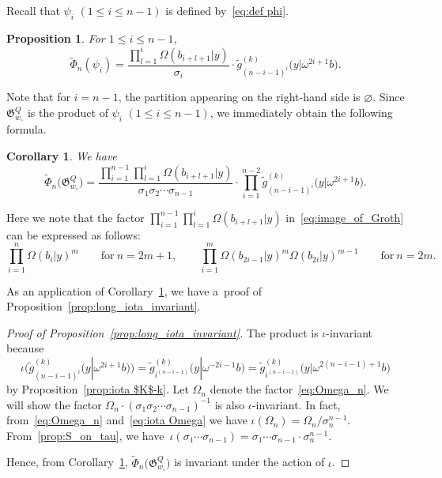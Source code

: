\documentclass[10pt,a4paper]{amsart}
\numberwithin{equation}{section}
\newcommand{\fac}{\psi}
\newtheorem{Corollary}[Theorem]{Corollary}
\newtheorem{Proposition}[Theorem]{Proposition}
\theoremstyle{definition}
\begin{document}
Recall that $\fac_i$ $(1\le i\le n-1)$ is defined by~\eqref{eq:def phi}.
\begin{Proposition}\label{prop:phi}
For $1\le i\le n-1$,
\[
\tilde{\Phi}_n(\fac_i)=
\frac{\prod_{l=1}^i\Omega(b_{i+l+1}|y)}{\sigma_i}\cdot\tilde{g}_{(n-i-1)^i}^{(k)}\bigl(y|\omega^{2i+1}b\bigr).
\]
\end{Proposition}
Note that for $i=n-1$,
the partition appearing on the right-hand side is $\varnothing$.
Since $\mathfrak{G}_{w_\circ}^Q$ is the product of $\fac_i$ $(1\le i\le n-1)$, we immediately obtain the following formula.
\begin{Corollary}\label{cor:image_of_Groth}
We have
\begin{equation}\label{eq:image_of_Groth}
\tilde{\Phi}_n\bigl(\mathfrak{G}_{w_\circ}^Q\bigr)
=
\frac{\prod_{i=1}^{n-1}\prod_{l=1}^i\Omega(b_{i+l+1}|y)}{{\sigma_1\sigma_2\cdots \sigma_{n-1}}}\cdot
{
\prod_{i=1}^{n-2}
\tilde{g}^{(k)}_{(n-i-1)^i}\bigl(y|\omega^{2i+1}b\bigr)
}.
\end{equation}
\end{Corollary}
Here we note
that the factor
$\prod_{i=1}^{n-1}\prod_{l=1}^i\Omega(b_{i+l+1}|y)$ in~\eqref{eq:image_of_Groth}
can be expressed as follows:
\begin{equation}
\label{eq:Omega_n}
\prod_{i=1}^n\Omega(b_i|y)^m\qquad \text{for} \ n=2m+1,\qquad
\prod_{i=1}^m\Omega(b_{2i-1}|y)^{m}\Omega(b_{2i}|y)^{m-1}\qquad \text{for} \  n=2m.
\end{equation}

As an application of Corollary~\ref{cor:image_of_Groth}, we have a~proof of Proposition~\ref{prop:long_iota_invariant}.
\begin{proof}[Proof of Proposition~\ref{prop:long_iota_invariant}]
The product  is $\iota$-invariant because
\[
\iota\bigl(\tilde{g}^{(k)}_{(n-i-1)^i}\bigl(y|\omega^{2i+1}b\bigr)\bigr)
=
\tilde{g}^{(k)}_{i^{(n-i-1)}}\bigl(y|\omega^{-2i-1}b\bigr)
=\tilde{g}^{(k)}_{i^{(n-i-1)}}\bigl(y|\omega^{2(n-i-1)+1}b\bigr)
\]
 by
Proposition~\ref{prop:iota $K$-k}.
Let $\Omega_n$ denote the factor~\eqref{eq:Omega_n}.
We will show the factor $\Omega_n\cdot (\sigma_1\sigma_2\cdots \sigma_{n-1})^{-1}$ is also $\iota$-invariant.
In fact, from~\eqref{eq:Omega_n} and~\eqref{eq:iota Omega} we have
$
\iota(\Omega_n)
=\Omega_n/ \sigma_n^{n-1}.
$
From~\eqref{prop:S_on_tau},
we have~${
\iota(\sigma_1\cdots \sigma_{n-1})=\sigma_1\cdots \sigma_{n-1}\cdot \sigma_n^{n-1}}$.

Hence, from Corollary~\ref{cor:image_of_Groth},
$\tilde{\Phi}_n\bigl(\mathfrak{G}_{w_\circ}^Q\bigr)$ is invariant under the action of $\iota$.
\end{proof}
\end{document}

